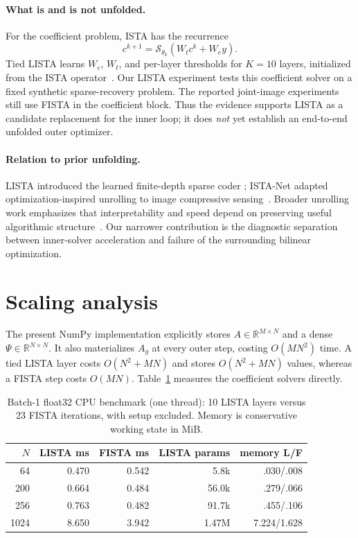 \documentclass[anon]{opt2026}
\begin{document}
\paragraph{What is and is not unfolded.}
For the coefficient problem, ISTA has the recurrence
\begin{equation}
 c^{k+1}=\mathcal S_{\theta_k}(W_tc^k+W_ey).
 \label{eq:lista}
\end{equation}
Tied LISTA learns $W_e$, $W_t$, and per-layer thresholds for $K=10$ layers,
initialized from the ISTA operator~\citep{gregor2010learning}.  Our LISTA
experiment tests this coefficient solver on a fixed synthetic sparse-recovery
problem.  The reported joint-image experiments still use FISTA in the
coefficient block.  Thus the evidence supports LISTA as a candidate
replacement for the inner loop; it does \emph{not} yet establish an end-to-end
unfolded outer optimizer.

\paragraph{Relation to prior unfolding.}
LISTA introduced the learned finite-depth sparse coder
\citep{gregor2010learning}; ISTA-Net adapted optimization-inspired unrolling
to image compressive sensing~\citep{zhang2018istanet}.  Broader unrolling work
emphasizes that interpretability and speed depend on preserving useful
algorithmic structure~\citep{monga2021algorithm}.  Our narrower contribution
is the diagnostic separation between inner-solver acceleration and failure of
the surrounding bilinear optimization.

\section{Scaling analysis}

The present NumPy implementation explicitly stores $A\in\mathbb{R}^{M\times
N}$ and a dense $\Psi\in\mathbb{R}^{N\times N}$.  It also materializes $A_g$
at every outer step, costing $O(MN^2)$ time.  A tied LISTA layer costs
$O(N^2+MN)$ and stores $O(N^2+MN)$ values, whereas a FISTA step costs
$O(MN)$.  Table~\ref{tab:scaling} measures the coefficient solvers directly.

\begin{table}[ht]
\caption{Batch-1 float32 CPU benchmark (one thread): 10 LISTA layers versus
23 FISTA iterations, with setup excluded. Memory is conservative working
state in MiB.}
\label{tab:scaling}
\centering
\small
\begin{tabular}{rrrrr}
\toprule
$N$ & LISTA ms & FISTA ms & LISTA params & memory L/F \\
\midrule
64   & 0.470 & 0.542 & 5.8k  & .030/.008 \\
200  & 0.664 & 0.484 & 56.0k & .279/.066 \\
256  & 0.763 & 0.482 & 91.7k & .455/.106 \\
1024 & 8.650 & 3.942 & 1.47M & 7.224/1.628 \\
\bottomrule
\end{tabular}
\end{table}
\end{document}
